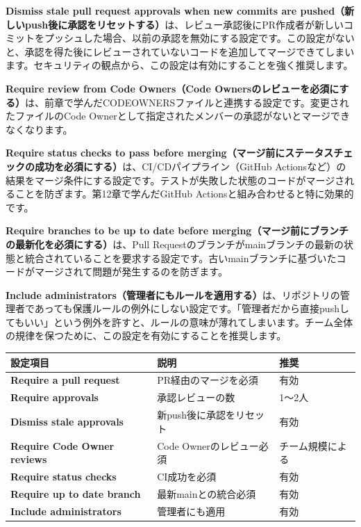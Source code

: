 \textbf{Dismiss stale pull request approvals when new commits are pushed（新しいpush後に承認をリセットする）}は、レビュー承認後にPR作成者が新しいコミットをプッシュした場合、以前の承認を無効にする設定です。この設定がないと、承認を得た後にレビューされていないコードを追加してマージできてしまいます。セキュリティの観点から、この設定は有効にすることを強く推奨します。

\textbf{Require review from Code Owners（Code Ownersのレビューを必須にする）}は、前章で学んだCODEOWNERSファイルと連携する設定です。変更されたファイルのCode Ownerとして指定されたメンバーの承認がないとマージできなくなります。

\textbf{Require status checks to pass before merging（マージ前にステータスチェックの成功を必須にする）}は、CI/CDパイプライン（GitHub Actionsなど）の結果をマージ条件にする設定です。テストが失敗した状態のコードがマージされることを防ぎます。第12章で学んだGitHub Actionsと組み合わせると特に効果的です。

\textbf{Require branches to be up to date before merging（マージ前にブランチの最新化を必須にする）}は、Pull Requestのブランチがmainブランチの最新の状態と統合されていることを要求する設定です。古いmainブランチに基づいたコードがマージされて問題が発生するのを防ぎます。

\textbf{Include administrators（管理者にもルールを適用する）}は、リポジトリの管理者であっても保護ルールの例外にしない設定です。「管理者だから直接pushしてもいい」という例外を許すと、ルールの意味が薄れてしまいます。チーム全体の規律を保つために、この設定を有効にすることを推奨します。

\begin{tabular}{|l|l|l|}
\hline
\textbf{設定項目} & \textbf{説明} & \textbf{推奨} \\
\hline
\textbf{Require a pull request} & PR経由のマージを必須 & 有効 \\
\hline
\textbf{Require approvals} & 承認レビューの数 & 1〜2人 \\
\hline
\textbf{Dismiss stale approvals} & 新push後に承認をリセット & 有効 \\
\hline
\textbf{Require Code Owner reviews} & Code Ownerのレビュー必須 & チーム規模による \\
\hline
\textbf{Require status checks} & CI成功を必須 & 有効 \\
\hline
\textbf{Require up to date branch} & 最新mainとの統合必須 & 有効 \\
\hline
\textbf{Include administrators} & 管理者にも適用 & 有効 \\
\hline
\end{tabular}

